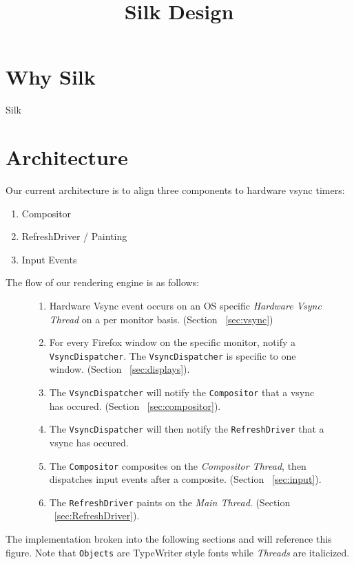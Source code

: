 \documentclass{article}
\begin{document}
\setlength{\parindent}{0cm} %
\title{Silk Design}
\maketitle

\section{Why Silk}
Silk

\section{Architecture}
Our current architecture is to align three components to hardware vsync timers:

\begin{enumerate}
\item Compositor
\item RefreshDriver / Painting
\item Input Events
\end{enumerate}

The flow of our rendering engine is as follows:

\begin{figure}[ht]
\begin{enumerate}
\item Hardware Vsync event occurs on an OS specific \textit{Hardware Vsync Thread} on a per monitor basis. (Section ~\ref{sec:vsync})
\item For every Firefox window on the specific monitor, notify a \texttt{VsyncDispatcher}. The \texttt{VsyncDispatcher} is specific to one window. (Section ~\ref{sec:displays}).
\item The \texttt{VsyncDispatcher} will notify the \texttt{Compositor} that a vsync has occured. (Section ~\ref{sec:compositor}).
\item The \texttt{VsyncDispatcher} will then notify the \texttt{RefreshDriver} that a vsync has occured.
\item The \texttt{Compositor} composites on the \textit{Compositor Thread}, then dispatches input events after a composite. (Section ~\ref{sec:input}).
\item The \texttt{RefreshDriver} paints on the \textit{Main Thread}. (Section ~\ref{sec:RefreshDriver}).
\end{enumerate}
\end{figure}

The implementation broken into the following sections and will reference this figure. Note that \texttt{Objects} are TypeWriter style fonts while \textit{Threads} are italicized.
\end{document}
